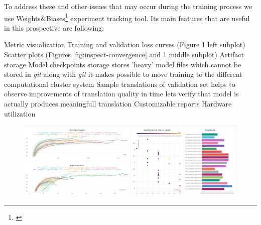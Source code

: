 To address these and other issues that may occur during the training process we use
Weights$\&$Biases\footnote{\cite{wandb}} experiment tracking tool.
Its main features that are useful in this prospective are following:
\begin{outline}
	\1 Metric visualization
		\2 Training and validation loss curves
		(Figure \ref{fig:single-lang-group-vs-random-dashboard} left subplot)
		\2 Scatter plots (Figures \ref{fig:inspect-convergence}
		and \ref{fig:single-lang-group-vs-random-dashboard} middle subplot)
	\1 Artifact storage
		\2 Model checkpoints storage
			\3 stores 'heavy' model files which cannot be stored
			in \emph{git}
			\3 along with \emph{git} it makes possible to move training
			to the different computational cluster system
		\2 Sample translations of validation set
			\3 helps to observe improvements of translation quality
			in time
			\3 lets verify that model is actually produces meaningfull
			translation
	\1 Customizable reports
	\1 Hardware utilization
\end{outline}

\begin{figure}
	\centering
	\includegraphics[width=1.0\columnwidth]{img/slavic_cyrillic_bg.png}
	\label{fig:single-lang-group-vs-random-dashboard}
\end{figure}


